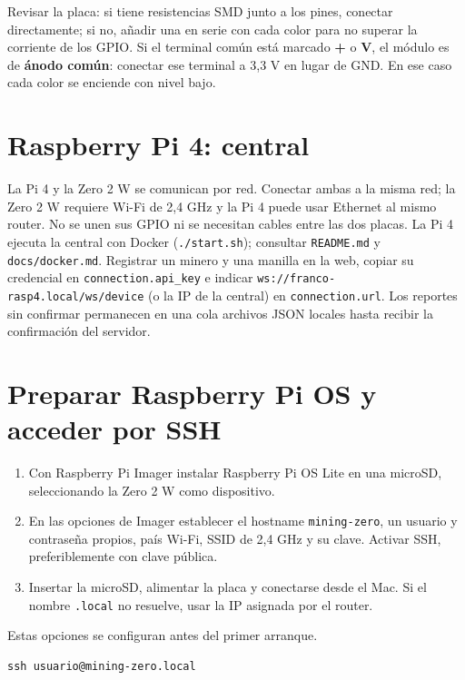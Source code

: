 \documentclass[11pt,a4paper]{article}
\begin{document}
Revisar la placa: si tiene resistencias SMD junto a los pines, conectar
directamente; si no, añadir una en serie con cada color para no superar la
corriente de los GPIO.\cite{ky016} Si el terminal común está marcado
\textbf{+} o \textbf{V}, el módulo es de \textbf{ánodo común}: conectar ese
terminal a 3,3 V en lugar de GND. En ese caso cada color se enciende con nivel
bajo.

\section{Raspberry Pi 4: central}

La Pi 4 y la Zero 2 W se comunican por red. Conectar ambas a la misma red; la
Zero 2 W requiere Wi-Fi de 2,4 GHz y la Pi 4 puede usar Ethernet al mismo
router. No se unen sus GPIO ni se necesitan cables entre las dos placas. La Pi 4
ejecuta la central con Docker (\texttt{./start.sh}); consultar
\texttt{README.md} y \texttt{docs/docker.md}. Registrar un minero y una manilla
en la web, copiar su credencial en \texttt{connection.api\_key} e indicar
\texttt{ws://franco-rasp4.local/ws/device} (o la IP de la central) en
\texttt{connection.url}. Los reportes sin confirmar permanecen en una cola
archivos JSON locales hasta recibir la confirmación del servidor.

\section{Preparar Raspberry Pi OS y acceder por SSH}

\begin{enumerate}
  \item Con Raspberry Pi Imager instalar Raspberry Pi OS Lite en una microSD,
  seleccionando la Zero 2 W como dispositivo.
  \item En las opciones de Imager establecer el hostname \texttt{mining-zero},
  un usuario y contraseña propios, país Wi-Fi, SSID de 2,4 GHz y su clave.
  Activar SSH, preferiblemente con clave pública.
  \item Insertar la microSD, alimentar la placa y conectarse desde el Mac. Si el
  nombre \texttt{.local} no resuelve, usar la IP asignada por el router.
\end{enumerate}
Estas opciones se configuran antes del primer arranque.\cite{rpi-start,rpi-remote}

\begin{lstlisting}
ssh usuario@mining-zero.local
\end{lstlisting}
\end{document}
